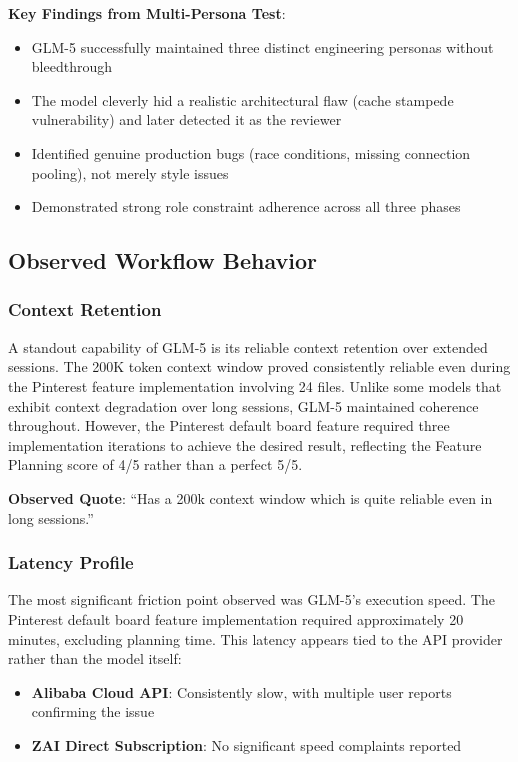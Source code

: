\documentclass[conference]{IEEEtran}
\begin{document}
\textbf{Key Findings from Multi-Persona Test}:
\begin{itemize}
    \item GLM-5 successfully maintained three distinct engineering personas without bleedthrough
    \item The model cleverly hid a realistic architectural flaw (cache stampede vulnerability) and later detected it as the reviewer
    \item Identified genuine production bugs (race conditions, missing connection pooling), not merely style issues
    \item Demonstrated strong role constraint adherence across all three phases
\end{itemize}

\subsection{Observed Workflow Behavior}

\subsubsection{Context Retention}
A standout capability of GLM-5 is its reliable context retention over extended sessions. The 200K token context window proved consistently reliable even during the Pinterest feature implementation involving 24 files. Unlike some models that exhibit context degradation over long sessions, GLM-5 maintained coherence throughout. However, the Pinterest default board feature required three implementation iterations to achieve the desired result, reflecting the Feature Planning score of 4/5 rather than a perfect 5/5.

\textbf{Observed Quote}: ``Has a 200k context window which is quite reliable even in long sessions.''

\subsubsection{Latency Profile}
The most significant friction point observed was GLM-5's execution speed. The Pinterest default board feature implementation required approximately 20 minutes, excluding planning time. This latency appears tied to the API provider rather than the model itself:

\begin{itemize}
    \item \textbf{Alibaba Cloud API}: Consistently slow, with multiple user reports confirming the issue
    \item \textbf{ZAI Direct Subscription}: No significant speed complaints reported
\end{itemize}
\end{document}
